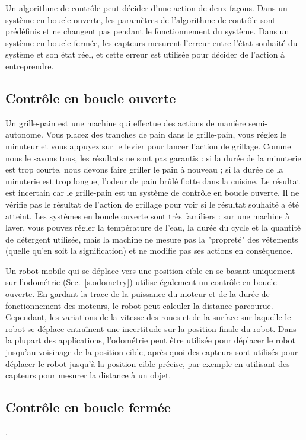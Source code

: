 Un algorithme de contrôle peut décider d'une action de deux façons. Dans un système en boucle ouverte, les paramètres de l'algorithme de contrôle sont prédéfinis et ne changent pas pendant le fonctionnement du système. Dans un système en boucle fermée, les capteurs mesurent l'erreur entre l'état souhaité du système et son état réel, et cette erreur est utilisée pour décider de l'action à entreprendre.

\subsection{Contrôle en boucle ouverte}

Un grille-pain est une machine qui effectue des actions de manière semi-autonome. Vous placez des tranches de pain dans le grille-pain, vous réglez le minuteur et vous appuyez sur le levier pour lancer l'action de grillage. Comme nous le savons tous, les résultats ne sont pas garantis : si la durée de la minuterie est trop courte, nous devons faire griller le pain à nouveau ; si la durée de la minuterie est trop longue, l'odeur de pain brûlé flotte dans la cuisine. Le résultat est incertain car le grille-pain est un système de contrôle en boucle ouverte. Il ne vérifie pas le résultat de l'action de grillage pour voir si le résultat souhaité a été atteint. Les systèmes en boucle ouverte sont très familiers : sur une machine à laver, vous pouvez régler la température de l'eau, la durée du cycle et la quantité de détergent utilisée, mais la machine ne mesure pas la "propreté" des vêtements (quelle qu'en soit la signification) et ne modifie pas ses actions en conséquence.

Un robot mobile qui se déplace vers une position cible en se basant uniquement sur l'odométrie (Sec.~\ref{s.odometry}) utilise également un contrôle en boucle ouverte. En gardant la trace de la puissance du moteur et de la durée de fonctionnement des moteurs, le robot peut calculer la distance parcourue. Cependant, les variations de la vitesse des roues et de la surface sur laquelle le robot se déplace entraînent une incertitude sur la position finale du robot. Dans la plupart des applications, l'odométrie peut être utilisée pour déplacer le robot jusqu'au voisinage de la position cible, après quoi des capteurs sont utilisés pour déplacer le robot jusqu'à la position cible précise, par exemple en utilisant des capteurs pour mesurer la distance à un objet.

\subsection{Contrôle en boucle fermée}.

